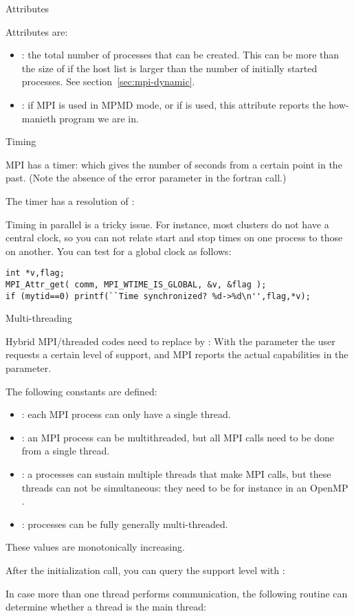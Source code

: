  {Attributes}


Attributes are:
\begin{itemize}
\item {}: the total number of processes
  that can be created. This can be more than the size of
   if the host list is larger than the number of
  initially started processes. See section~\ref{sec:mpi-dynamic}.
\item {}: if MPI is used in \ac{MPMD} mode, or
  if  is used, this attribute
  reports the how-manieth program we are in.
\end{itemize}

 {Timing}
\label{sec:ref:mpi-timing}

MPI has a  timer: 
%
%
which gives the number of seconds from a certain point in the past.
(Note the absence of the error parameter in the fortran call.)

The timer has a resolution of :
%

Timing in parallel is a tricky issue. For instance, most clusters do
not have a central clock, so you can not relate start and stop times
on one process to those on another. You can test for a global clock as
follows:
\begin{verbatim}
int *v,flag;
MPI_Attr_get( comm, MPI_WTIME_IS_GLOBAL, &v, &flag );
if (mytid==0) printf(``Time synchronized? %d->%d\n'',flag,*v);
\end{verbatim}


 {Multi-threading}
\label{sec:ref:mpi-thread}

Hybrid MPI/threaded codes need to replace 
by :
%
%
With the  parameter the user requests a certain level of support,
and MPI reports the actual capabilities in the  parameter.

The following constants are defined:
\begin{itemize}
\item {}: each MPI process can only have
  a single thread.
\item {}: an MPI process can be
  multithreaded, but all MPI calls need to be done from a single
  thread.
\item {}: a processes can sustain
  multiple threads that make MPI calls, but these threads can not be
  simultaneous: they need to be for instance in an OpenMP
  .
\item {}: processes can be fully
  generally multi-threaded.
\end{itemize}
These values are monotonically increasing.

After the initialization call, you can query the support level
with :
%

In case more than one thread performs communication, the following routine
can determine whether a thread is the main thread:
%
